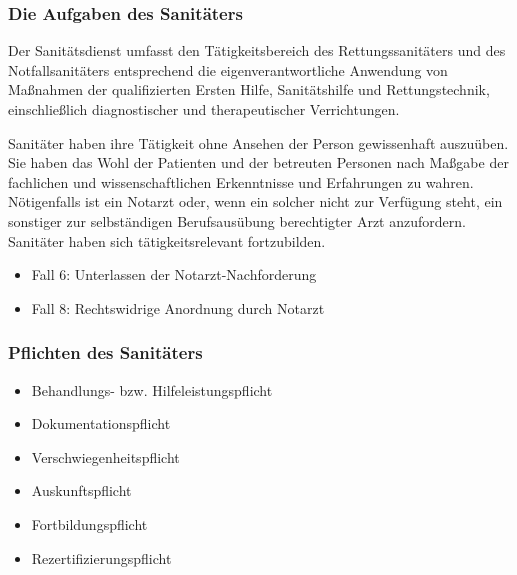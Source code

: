 \subsubsection{Die Aufgaben des Sanitäters}

Der Sanitätsdienst umfasst den Tätigkeitsbereich des
Rettungssanitäters und des Notfallsanitäters entsprechend
die eigenverantwortliche Anwendung von Maßnahmen der 
qualifizierten Ersten Hilfe, Sanitätshilfe und 
Rettungstechnik, einschließlich diagnostischer und
therapeutischer Verrichtungen.

Sanitäter haben ihre Tätigkeit ohne Ansehen der
Person gewissenhaft auszuüben. Sie haben das Wohl der
Patienten und der betreuten Personen nach Maßgabe der
fachlichen und wissenschaftlichen Erkenntnisse und
Erfahrungen zu wahren. Nötigenfalls ist ein Notarzt oder,
wenn ein solcher nicht zur Verfügung steht, ein sonstiger
zur selbständigen Berufsausübung berechtigter Arzt
anzufordern. Sanitäter haben sich tätigkeitsrelevant
fortzubilden. 


{
\begin{itemize}
  \item Fall 6: Unterlassen der Notarzt-Nachforderung
  \dotfill{}
  \item Fall 8: Rechtswidrige Anordnung durch Notarzt
  \dotfill{}
\end{itemize}
}
{}
{}
{}
{}

\subsubsection{Pflichten des Sanitäters}
\label{topic:sanitaeter-pflichten}

\begin{itemize}
  \item Behandlungs- bzw. Hilfeleistungspflicht  
  \item Dokumentationspflicht
  \item Verschwiegenheitspflicht
  \item Auskunftspflicht
  \item Fortbildungspflicht
  \item Rezertifizierungspflicht
\end{itemize}

